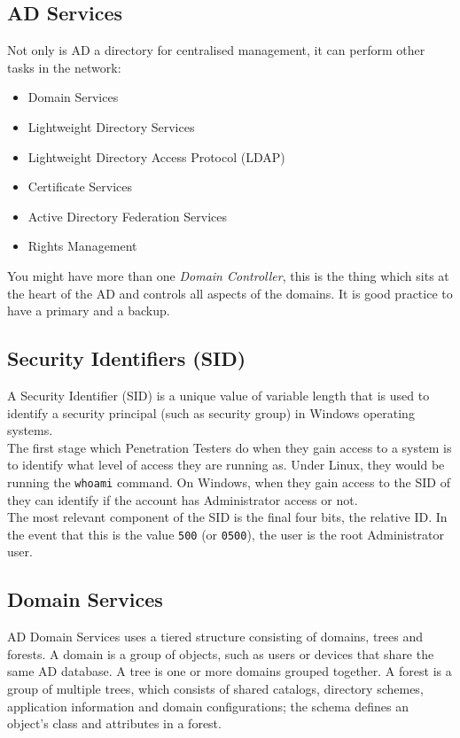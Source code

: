 \subsection{AD Services}
Not only is AD a directory for centralised management, it can perform other tasks in the network:
\begin{itemize}
    \item Domain Services
    \item Lightweight Directory Services
    \item Lightweight Directory Access Protocol (LDAP)
    \item Certificate Services
    \item Active Directory Federation Services
    \item Rights Management
\end{itemize}

You might have more than one \textit{Domain Controller}, this is the thing which sits at the heart of the AD and controls all aspects of the domains. It is good practice to have a primary and a backup. 

\subsection{Security Identifiers (SID)}
A Security Identifier (SID) is a unique value of variable length that is used to identify a security principal (such as security group) in Windows operating systems.\\

The first stage which Penetration Testers do when they gain access to a system is to identify what level of access they are running as. Under Linux, they would be running the \verb|whoami| command. On Windows, when they gain access to the SID of they can identify if the account has Administrator access or not.\\

The most relevant component of the SID is the final four bits, the relative ID. In the event that this is the value \verb|500| (or \verb|0500|), the user is the root Administrator user. 

\subsection{Domain Services}
AD Domain Services uses a tiered structure consisting of domains, trees and forests. A domain is a group of objects, such as users or devices that share the same AD database. A tree is one or more domains grouped together. A forest is a group of multiple trees, which consists of shared catalogs, directory schemes, application information and domain configurations; the schema defines an object's class and attributes in a forest. \\

